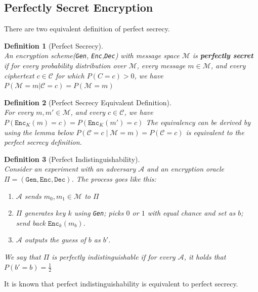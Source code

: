 \documentclass[12pt]{article}
\newtheorem{definition}{Definition}[section]
\theoremstyle{definition}
\begin{document}
\subsection{Perfectly Secret Encryption}
There are two equivalent definition of perfect secrecy.
\begin{definition}[Perfect Secrecy]
\hfill\\\normalfont An encryption scheme(\texttt{Gen}, \texttt{Enc},\texttt{Dec}) with message space $\mathcal{M}$ is \textbf{perfectly secret} if for \textit{every} probability distribution over $\mathcal{M}$, every message $m\in \mathcal{M}$, and every ciphertext $c\in \mathcal{C}$ for which $P(C=c)>0$, we have
$
P(\mathcal{M}=m|\mathcal{C}=c) = P(\mathcal{M}=m)
$
\end{definition}
\begin{definition}[Perfect Secrecy Equivalent Definition]
\hfill\\\normalfont For every $m, m'\in\mathcal{M}$, and every $c\in\mathcal{C}$, we have
$
P(\texttt{Enc}_K(m)=c) = P(\texttt{Enc}_K(m') = c)
$
The equivalency can be derived by using the lemma below
$
P(\mathcal{C}=c\mid \mathcal{M}=m) = P(\mathcal{C}=c)
$
is equivalent to the perfect secrecy definition.
\end{definition}
\begin{definition}[Perfect Indistinguishability]
\hfill\\\normalfont Consider an experiment with an adversary $\mathcal{A}$ and an encryption oracle $\Pi=(\texttt{Gen}, \texttt{Enc},\texttt{Dec})$. The process goes like this:
\begin{enumerate}
  \item $\mathcal{A}$ sends $m_0, m_1\in\mathcal{M}$ to $\Pi$
  \item $\Pi$ generates key $k$ using \texttt{Gen}; picks $0$ or $1$ with equal chance and set as $b$; send back $\texttt{Enc}_k(m_b)$.
  \item $\mathcal{A}$ outputs the guess of $b$ as $b'$.
\end{enumerate}
We say that $\Pi$ is perfectly indistinguishable if for \textit{every} $\mathcal{A}$, it holds that
$
P(b'=b) = \frac{1}{2}
$
\end{definition}
It is known that perfect indistinguishability is equivalent to perfect secrecy.
\end{document}
